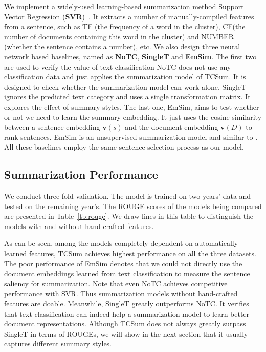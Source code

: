 \documentclass[letterpaper]{article}
\begin{document}
We implement a widely-used learning-based summarization method Support Vector Regression  (\textbf{SVR})~\cite{li2007multi}.
It extracts a number of manually-compiled features from a sentence, such as TF (the frequency of a word in the cluster), CF(the number of documents containing this word in the cluster) and NUMBER (whether the sentence contains a number), etc.
We also design three neural network based baselines, named as \textbf{NoTC}, \textbf{SingleT} and \textbf{EmSim}.
The first two are used to verify the value of text classification
NoTC does not use any classification data and just applies the summarization model of TCSum.
It is designed to check whether the summarization model can work alone.
SingleT ignores the predicted text category and uses a single transformation matrix.
It explores the effect of summary styles.
The last one, EmSim, aims to test whether or not we need to learn the summary embedding.
It just uses the cosine similarity between a sentence embedding ${\mathbf{v}}(s)$ and the document embedding ${\mathbf{v}}(D)$ to rank sentences.
EmSim is an unsupervised summarization model and similar to \cite{kobayashi-noguchi-yatsuka:2015:EMNLP}.
All these baselines employ the same sentence selection process as our model.

\subsection{Summarization Performance}
We conduct three-fold validation.
The model is trained on two years' data and tested on the remaining year's.
The ROUGE scores of the models being compared are presented in Table~\ref{tb:rouge}.
We draw lines in this table to distinguish the models with and without hand-crafted features.

As can be seen, among the models completely dependent on automatically learned features, TCSum achieves highest performance on all the three datasets.
The poor performance of EmSim denotes that we could not directly use the document embeddings learned from text classification to measure the sentence saliency for summarization.
Note that even NoTC achieves competitive performance with SVR.
Thus summarization models without hand-crafted features are doable.
Meanwhile, SingleT greatly outperforms NoTC.
It verifies that text classification can indeed help a summarization model to learn better document representations.
Although TCSum does not always greatly surpass SingleT in terms of ROUGEs, we will show in the next section that it usually captures different summary styles.
\end{document}
